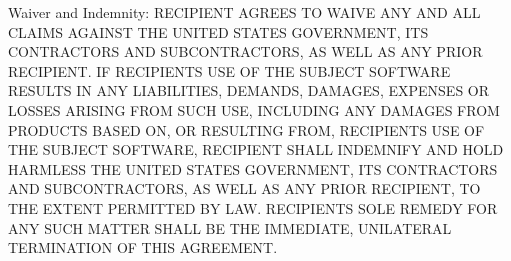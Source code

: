 Waiver and Indemnity\+: R\+E\+C\+I\+P\+I\+E\+NT A\+G\+R\+E\+ES TO W\+A\+I\+VE A\+NY A\+ND A\+LL C\+L\+A\+I\+MS A\+G\+A\+I\+N\+ST T\+HE U\+N\+I\+T\+ED S\+T\+A\+T\+ES G\+O\+V\+E\+R\+N\+M\+E\+NT, I\+TS C\+O\+N\+T\+R\+A\+C\+T\+O\+RS A\+ND S\+U\+B\+C\+O\+N\+T\+R\+A\+C\+T\+O\+RS, AS W\+E\+LL AS A\+NY P\+R\+I\+OR R\+E\+C\+I\+P\+I\+E\+NT. IF R\+E\+C\+I\+P\+I\+E\+NT\textquotesingle{}S U\+SE OF T\+HE S\+U\+B\+J\+E\+CT S\+O\+F\+T\+W\+A\+RE R\+E\+S\+U\+L\+TS IN A\+NY L\+I\+A\+B\+I\+L\+I\+T\+I\+ES, D\+E\+M\+A\+N\+DS, D\+A\+M\+A\+G\+ES, E\+X\+P\+E\+N\+S\+ES OR L\+O\+S\+S\+ES A\+R\+I\+S\+I\+NG F\+R\+OM S\+U\+CH U\+SE, I\+N\+C\+L\+U\+D\+I\+NG A\+NY D\+A\+M\+A\+G\+ES F\+R\+OM P\+R\+O\+D\+U\+C\+TS B\+A\+S\+ED ON, OR R\+E\+S\+U\+L\+T\+I\+NG F\+R\+OM, R\+E\+C\+I\+P\+I\+E\+NT\textquotesingle{}S U\+SE OF T\+HE S\+U\+B\+J\+E\+CT S\+O\+F\+T\+W\+A\+RE, R\+E\+C\+I\+P\+I\+E\+NT S\+H\+A\+LL I\+N\+D\+E\+M\+N\+I\+FY A\+ND H\+O\+LD H\+A\+R\+M\+L\+E\+SS T\+HE U\+N\+I\+T\+ED S\+T\+A\+T\+ES G\+O\+V\+E\+R\+N\+M\+E\+NT, I\+TS C\+O\+N\+T\+R\+A\+C\+T\+O\+RS A\+ND S\+U\+B\+C\+O\+N\+T\+R\+A\+C\+T\+O\+RS, AS W\+E\+LL AS A\+NY P\+R\+I\+OR R\+E\+C\+I\+P\+I\+E\+NT, TO T\+HE E\+X\+T\+E\+NT P\+E\+R\+M\+I\+T\+T\+ED BY L\+AW. R\+E\+C\+I\+P\+I\+E\+NT\textquotesingle{}S S\+O\+LE R\+E\+M\+E\+DY F\+OR A\+NY S\+U\+CH M\+A\+T\+T\+ER S\+H\+A\+LL BE T\+HE I\+M\+M\+E\+D\+I\+A\+TE, U\+N\+I\+L\+A\+T\+E\+R\+AL T\+E\+R\+M\+I\+N\+A\+T\+I\+ON OF T\+H\+IS A\+G\+R\+E\+E\+M\+E\+NT. 